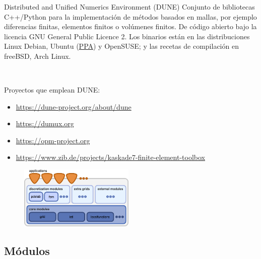 \begin{frame}
	\frametitle{\secname}
	\framesubtitle{\subsecname}

	\begin{alertblock}{Distributed and Unified Numerics Environment (DUNE)}
		Conjunto de bibliotecas C++/Python para la implementación de métodos basados en mallas, por ejemplo diferencias finitas, elementos finitos o volúmenes finitos.
		De código abierto bajo la licencia GNU General Public Licence 2.
		Los binarios están en las distribuciones Linux Debian, Ubuntu (\href{https://launchpad.net/~opm/+archive/ubuntu/ppa}{PPA}) y OpenSUSE; y las recetas de compilación en freeBSD, Arch Linux.

		\

		Proyectos que emplean DUNE:
		\begin{itemize}
			\item \url{https://dune-project.org/about/dune}
			\item \url{https://dumux.org}
			\item \url{https://opm-project.org}
			\item \url{https://www.zib.de/projects/kaskade7-finite-element-toolbox}
		\end{itemize}
	\end{alertblock}

	\begin{figure}[ht!]
		\centering
		\includegraphics[height=3cm]{dunedesign}
	\end{figure}

\end{frame}

\subsection{Módulos}

